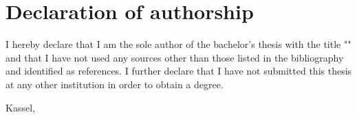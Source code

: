 \chapter*{Declaration of authorship}


I hereby declare that I am the sole author of the bachelor’s thesis with the title "\thesistitle" 
and that I have not used any sources other than those listed in the bibliography and identified as references. 
I further declare that I have not submitted this thesis at any other institution in order to obtain a degree.

\vspace{1cm}

Kassel, \thesisdate

\begin{flushright}
  \underline{\hspace{7cm}} \\
  \thesisauthorname
\end{flushright}

